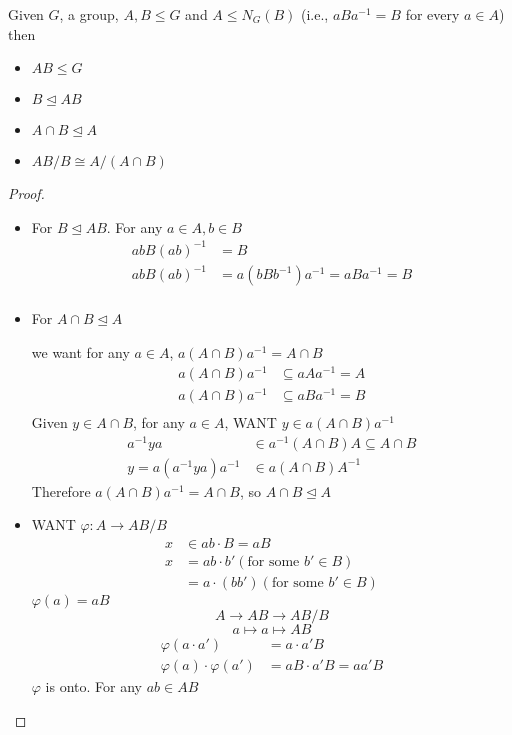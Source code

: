 \begin{theorem}
  Given $G$, a group, $A, B \le G$ and $A \le N_G(B)$
  (i.e., $aBa^{-1} = B$ for every $a \in A$)
  then 
  \begin{itemize}
    \item $AB \le G$ 
    \item $B \unlhd AB$ 
    \item $A \cap B \unlhd A$
    \item $AB/B \cong A / (A \cap B)$
  \end{itemize}
\end{theorem}

\begin{proof}
  \text{ }
  \begin{itemize}
    \item 
  For $B \unlhd AB$.
  For any $a \in A, b \in B$
  \begin{align*}
    abB(ab)^{-1} &= B \\
    abB(ab)^{-1} &=a(bBb^{-1})a^{-1} = aBa^{-1} = B \\
  \end{align*}
  \item For $A \cap B \unlhd A$

  we want for any $a \in A$, $a(A \cap B) a^{-1} = A \cap B$
  \begin{align*}
    a(A \cap B) a^{-1} &\subseteq aAa^{-1} = A \\
    a(A \cap B) a^{-1} &\subseteq aBa^{-1} = B \\
  \end{align*}
  Given $y \in A \cap B$, for any $a \in A$, WANT $y \in a(A \cap B) a^{-1}$
  \begin{align*}
    a^{-1}ya &\in a^{-1}(A\cap B)A \subseteq A \cap B \\
    y = a(a^{-1}ya)a^{-1} &\in a(A \cap B)A^{-1}
  \end{align*}
  Therefore $a(A \cap B) a^{-1} = A \cap B$, so $A \cap B \unlhd A$
  \item WANT $\varphi: A \to AB/B$
  \begin{align*}
    x &\in ab \cdot B = aB \\
    x &= ab \cdot b' (\text{for some }b' \in B)\\
    &= a\cdot (bb')(\text{for some }b' \in B)
  \end{align*}
  $\varphi(a) = aB$
  \[A \to AB \to AB/B\]
  \[a \mapsto a \mapsto AB\]
  \begin{align*}
    \varphi(a \cdot a') &= a\cdot a' B \\
    \varphi(a)\cdot \varphi(a') &= aB\cdot a'B = aa'B
  \end{align*}
  $\varphi$ is onto. For any $ab \in AB$
  \end{itemize}

\end{proof}

